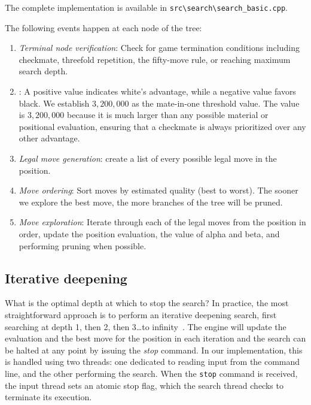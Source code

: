 \vspace{1em}

\noindent \parbox{\textwidth}{The complete implementation is available in \texttt{src\textbackslash{}search\textbackslash{}search\_basic.cpp}.}

\vspace{1em}

\noindent The following events happen at each node of the tree:

\begin{enumerate}
    \item \textit{Terminal node verification}: Check for game termination conditions including checkmate, threefold repetition, the fifty-move rule, or reaching maximum search depth.
    \item {}: A positive value indicates white's advantage, while a negative value favors black. We establish $3,200,000$ as the mate-in-one threshold value. The value is $3,200,000$ because it is much larger than any possible material or positional evaluation, ensuring that a checkmate is always prioritized over any other advantage.
    \item \textit{Legal move generation}: create a list of every possible legal move in the position.
    \item \textit{Move ordering}: Sort moves by estimated quality (best to worst). The sooner we explore the best move, the more branches of the tree will be pruned.
    \item \textit{Move exploration}: Iterate through each of the legal moves from the position in order, update the position evaluation, the value of alpha and beta, and performing pruning when possible.
\end{enumerate}

\subsection*{Iterative deepening}\label{sec:iterativeDeepening}

What is the optimal depth at which to stop the search? In practice, the most straightforward approach is to perform an iterative deepening search, first searching at depth 1, then 2, then 3\ldots to infinity~\cite{IterativeDeepening}. The engine will update the evaluation and the best move for the position in each iteration and the search can be halted at any point by issuing the \textit{stop} command. In our implementation, this is handled using two threads: one dedicated to reading input from the command line, and the other performing the search. When the \texttt{stop} command is received, the input thread sets an atomic stop flag, which the search thread checks to terminate its execution.

